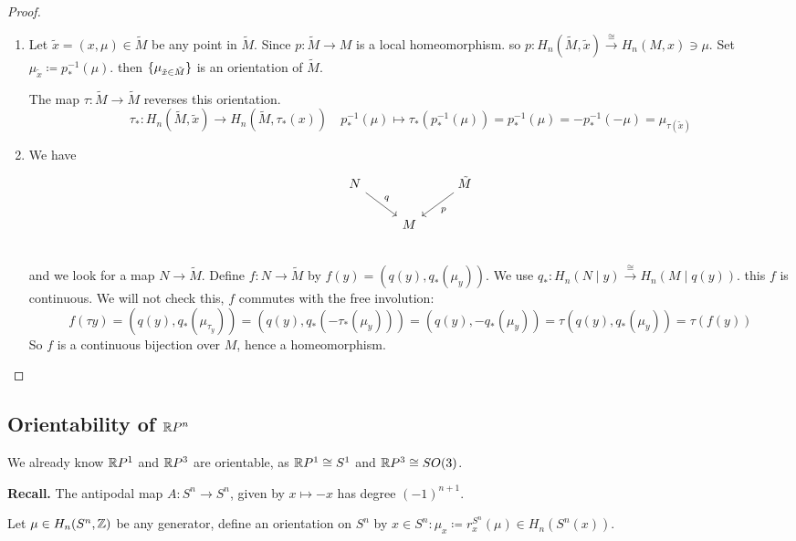 \documentclass[language=english]{TemplateLecture}
\begin{document}
\begin{proof}\leavevmode
    \begin{enumerate}
        \item Let \(\tilde x = (x, \mu) \in \tilde M\) be any point in \(\tilde M\). Since \(p\colon \tilde M \to M\) is a local homeomorphism. so \(p\colon H_n(\tilde M, \tilde x) \xrightarrow{\cong} H_n(M, x) \ni \mu\). Set \(\mu_{\tilde x} \coloneq p_*^{-1}(\mu)\). then \(\{\mu_{\tilde x \in \tilde M}\}\) is an orientation of \(\tilde M\).
        
        The map \(\tau \colon \tilde M \to \tilde M\) reverses this orientation.
        \[\tau_*\colon H_n(\tilde M, \tilde x) \to H_n(\tilde M, \tau_*(x))\quad p_*^{-1}(\mu)\mapsto \tau_*(p_*^{-1}(\mu)) = p_*^{-1}(\mu) = - p_*^{-1}(-\mu) = \mu_{\tau(\tilde x)}\]

        \item We have
        \[\begin{tikzcd}
            N \ar[rd, "q"] & & \tilde M \ar[ld, "p"]\\
            & M & \\
        \end{tikzcd}\]
        and we look for a map \(N \to \tilde M\). Define \(f\colon N \to \tilde M\) by \(f(y) = (q(y), q_*(\mu_y))\). We use \(q_*\colon H_n(N\mid y) \xrightarrow{\cong} H_n(M\mid q(y))\). this \(f\) is continuous. We will not check this, \(f\) commutes with the free involution:
        \[f(\tau y) = (q(y), q_*(\mu_{\tau_y})) = (q(y), q_*(-\tau_*(\mu_y))) = (q(y), -q_*(\mu_y)) = \tau(q(y), q_*(\mu_y)) = \tau(f(y))\]
        So \(f\) is a continuous bijection over \(M\), hence a homeomorphism.
    \end{enumerate}
\end{proof}

\subsection{Orientability of \(\mathbb{R} P^n\)}

We already know \(\mathbb{R} P ^1\) and \(\mathbb{R} P^3\) are orientable, as \(\mathbb{R} P^1 \cong S^1\) and \(\mathbb{R} P^3 \cong SO(3)\).

\textbf{Recall.} The antipodal map \(A\colon S^n \to S^n\), given by \(x \mapsto -x\) has degree \((-1)^{n+1}\).

Let \(\mu \in H_n(S^n, \mathbb{Z})\) be any generator, define an orientation on \(S^n\) by \(x \in S^n : \mu_x \coloneq r_x^{S^n}(\mu) \in H_n(S^n(x))\).
\end{document}
